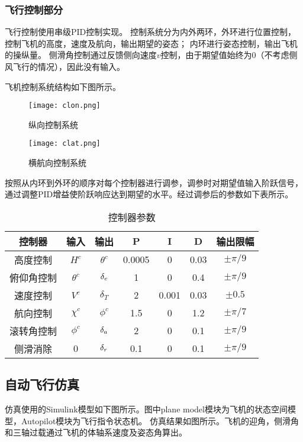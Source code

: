 \subsubsection{飞行控制部分}
飞行控制使用串级PID控制实现。
控制系统分为内外两环，外环进行位置控制，控制飞机的高度，速度及航向，输出期望的姿态；
内环进行姿态控制，输出飞机的操纵量。
侧滑角控制通过反馈侧向速度$v$控制，由于期望值始终为0（不考虑侧风飞行的情况），因此没有输入。

飞机控制系统结构如下图所示。
\begin{figure}[!h]
\centering\texttt{[image: clon.png]}
\caption{纵向控制系统}
\label{clon}
\end{figure}
\begin{figure}[!h]
\centering\texttt{[image: clat.png]}
\caption{横航向控制系统}
\label{clat}
\end{figure}

按照从内环到外环的顺序对每个控制器进行调参，调参时对期望值输入阶跃信号，通过调整PID增益使阶跃响应达到期望的水平。经过调参后的参数如下表所示。

\begin{table}[!ht]
\centering
\caption{控制器参数}
\label{pid}
\begin{tabular}{@{}ccccccc@{}}
\toprule
控制器 		& 输入 		& 输出 		& P		& I & D 	& 输出限幅 \\ \midrule
高度控制 	& $H^c$ 	& $\theta^c$&0.0005	& 0	&0.03	& $\pm\pi/9$ \\
俯仰角控制 	& $\theta^c$& ${\delta_e}$		& 1		& 0	&0.4 	& $\pm\pi/9$ \\
速度控制 	& $V^c$		& $\delta_T$		& 2		&0.001& 0.03& $\pm0.5$ \\
航向控制 	& $\chi^c$	& $\phi^c$	& 1.5 	& 0	& 1.2 	& $\pm\pi/7$ \\
滚转角控制 	& $\phi^c$	& ${\delta_a}$		& 2 	& 0	& 0.1 	& $\pm\pi/9$ \\
侧滑消除 	& 0 		& ${\delta_r}$		& 0.1 	& 0	& 0.1 	& $\pm\pi/9$ \\ \bottomrule
\end{tabular}
\end{table}

\clearpage
\subsection{自动飞行仿真}
仿真使用的Simulink模型如下图所示。图中plane model模块为飞机的状态空间模型，Autopilot模块为飞行指令状态机。
仿真结果如图所示。飞机的迎角，侧滑角和三轴过载通过飞机的体轴系速度及姿态角算出。

